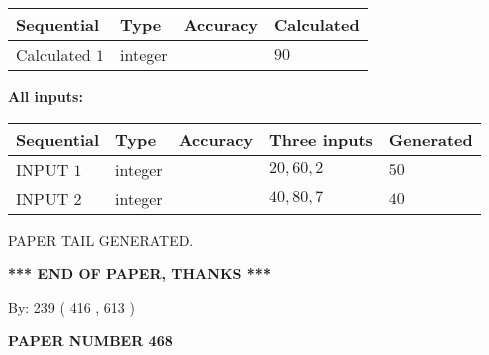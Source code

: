 \documentclass[12pt]{article}
\begin{document}
   
   
   
\noindent{}
   
   
  
  
\noindent\begin{tabular}{|l|l|l|l|}
\hline
 Sequential & Type & Accuracy & Calculated \\ 
\hline
 
 
  Calculated $  1 $ & integer &  & 
  $ 90 $ 
 \\  \hline  
 \end{tabular}
   
   
   
   
\noindent\vspace{0.1in}\hspace{-0.08in} {\textbf{\Large{All inputs: }}}
   
   
  
  
\noindent\begin{tabular}{|l|l|l|l|l|}
\hline
 Sequential & Type & Accuracy & Three inputs & Generated \\ 
\hline
 
 
  INPUT $  1 $ & integer &  & $
 20
 , 
 60
 , 
 2
 $ & $ 50 $ 
 \\  \hline  
 
 
  INPUT $  2 $ & integer &  & $
 40
 , 
 80
 , 
 7
 $ & $ 40 $ 
 \\  \hline  
 \end{tabular}
   
   
   
   
   
   
 \vspace{0.2in}
 
   
   
\vspace{2.0in} PAPER TAIL GENERATED.
   
   
   
   
\vspace{1.0in} 
{\textbf{\large{ *** END OF PAPER, THANKS *** }}} 
   
   
\hspace{1.0in} By: 
 239 ( 416 ,  613 )
   
   
   
   
\newpage 
\setcounter{page}{ 
   468001 } 
   
   
   
   
 {\textbf{ \Large{ PAPER NUMBER  468  }}}
   
\end{document}
